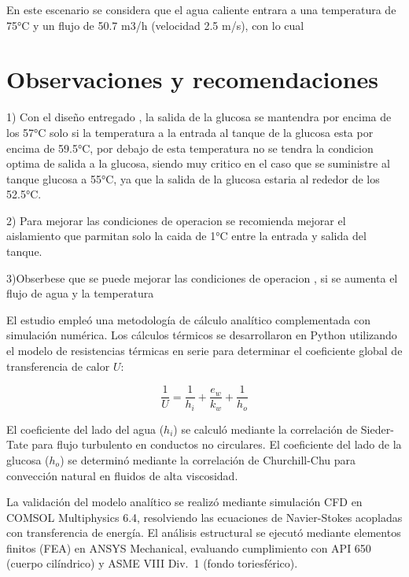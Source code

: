 \documentclass[11pt,a4paper]{article}
\begin{document}
En este escenario se considera que el agua caliente entrara a una temperatura de 75°C y un flujo de 50.7 m3/h (velocidad 2.5 m/s), con lo cual 



\section{Observaciones y recomendaciones}


1) Con el diseño entregado , la salida de la glucosa se mantendra por encima de los 57°C solo si la temperatura a la entrada al tanque de la glucosa esta por encima de 59.5°C, por debajo de esta temperatura no se tendra la condicion optima de salida a la glucosa, siendo muy critico en el caso que se suministre al tanque glucosa a 55°C, ya que la salida de la glucosa estaria al rededor de los 52.5°C.

2) Para mejorar las condiciones de operacion se recomienda mejorar el aislamiento que parmitan solo la caida de 1°C entre la entrada y salida del tanque.

3)Obserbese que se puede mejorar las condiciones de operacion , si se aumenta el flujo de agua y la temperatura 




El estudio empleó una metodología de cálculo analítico complementada con simulación numérica. Los cálculos térmicos se desarrollaron en Python utilizando el modelo de resistencias térmicas en serie para determinar el coeficiente global de transferencia de calor $U$:

\vspace{-0.2cm}
\begin{equation}
\frac{1}{U} = \frac{1}{h_i} + \frac{e_w}{k_w} + \frac{1}{h_o}
\end{equation}

El coeficiente del lado del agua ($h_i$) se calculó mediante la correlación de Sieder-Tate para flujo turbulento en conductos no circulares. El coeficiente del lado de la glucosa ($h_o$) se determinó mediante la correlación de Churchill-Chu para convección natural en fluidos de alta viscosidad.

La validación del modelo analítico se realizó mediante simulación CFD en COMSOL Multiphysics 6.4, resolviendo las ecuaciones de Navier-Stokes acopladas con transferencia de energía. El análisis estructural se ejecutó mediante elementos finitos (FEA) en ANSYS Mechanical, evaluando cumplimiento con API 650 (cuerpo cilíndrico) y ASME VIII Div.~1 (fondo toriesférico).
\end{document}
